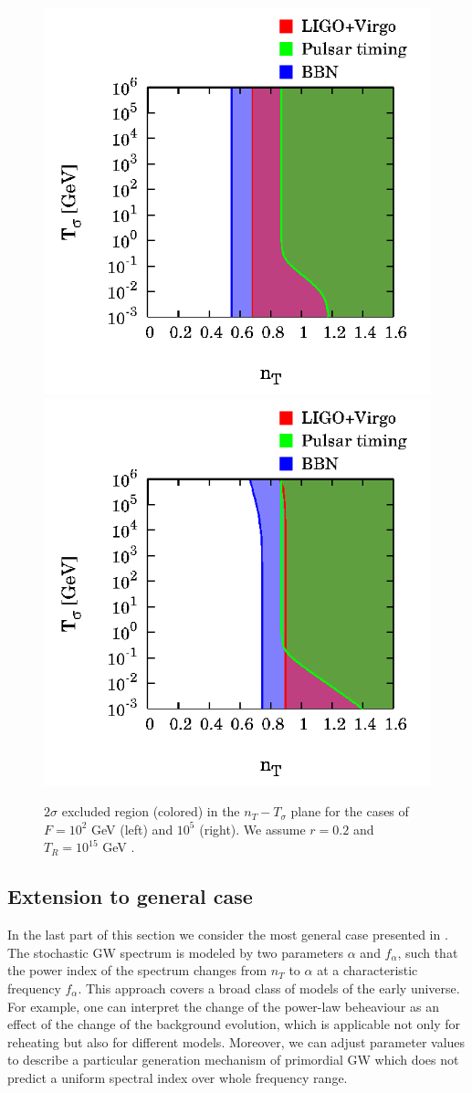 \documentclass[11pt,a4paper,twoside]{book}
\begin{document}
\begin{figure}[h]
	\centering
	\includegraphics[width=0.45\linewidth, height=0.3\textheight]{Images/Chap3/Kurojanagi_Takahashi_Fig5A}
	\includegraphics[width=0.45\linewidth, height=0.3\textheight]{Images/Chap3/Kurojanagi_Takahashi_Fig5B}
	\caption{$ 2\sigma $ excluded region (colored) in the $ n_{T}-T_{\sigma} $ plane for the cases of $ F=10^{2} $ GeV (left) and $ 10^{5} $ (right). We assume $ r=0.2 $ and $ T_{R}=10^{15} $ GeV \cite{Chap3:BlueTiltedSpectrum}.}
	\label{fig:kurojanagitakahashifig5a}
\end{figure}
\subsection{Extension to general case}
In the last part of this section we consider the most general case presented in \cite{Chap3:BlueTiltedSpectrum}. The stochastic GW spectrum is modeled by two parameters $\alpha$ and $ f_{\alpha} $, such that the power index of the spectrum changes from $ n_{T} $ to $\alpha$ at a characteristic frequency $ f_{\alpha} $. This approach covers a broad class of models of the early universe. For example, one can interpret the change of the power-law beheaviour as an effect of the change of the background evolution, which is applicable not only for reheating but also for different models. Moreover, we can adjust parameter values to describe a particular generation mechanism of primordial GW which does not predict a uniform spectral index over whole frequency range. 
\end{document}
